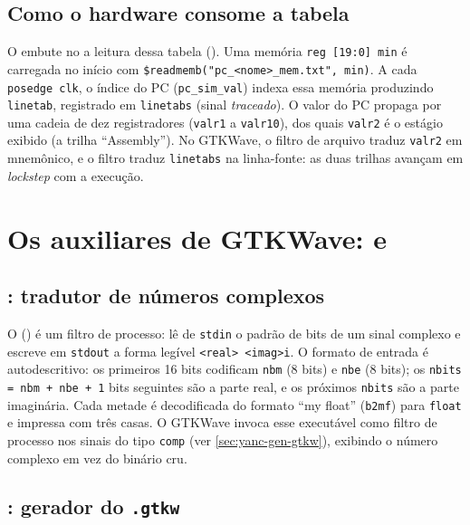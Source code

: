 \subsection{Como o hardware consome a tabela}
\label{sec:yanc-sidetable-hw}

O  embute no  a leitura dessa tabela
(). Uma memória \lstinline|reg [19:0] min| é carregada no início com
\lstinline|$readmemb("pc_<nome>_mem.txt", min)|. A cada \lstinline|posedge clk|,
o índice do PC (\lstinline|pc_sim_val|) indexa essa memória produzindo
\lstinline|linetab|, registrado em \lstinline|linetabs| (sinal \emph{traceado}). O
valor do PC propaga por uma cadeia de dez registradores (\lstinline|valr1| a
\lstinline|valr10|), dos quais \lstinline|valr2| é o estágio exibido (a trilha
\enquote{Assembly}). No GTKWave, o filtro de arquivo 
traduz \lstinline|valr2| em mnemônico, e o filtro  traduz
\lstinline|linetabs| na linha-fonte: as duas trilhas avançam em \emph{lockstep}
com a execução.

\section{Os auxiliares de GTKWave:  e }
\label{sec:yanc-gtkw}

\subsection{: tradutor de números complexos}
\label{sec:yanc-comp2gtkw}

O  () é um filtro de processo: lê de
\lstinline|stdin| o padrão de bits de um sinal complexo e escreve em
\lstinline|stdout| a forma legível \lstinline|<real> <imag>i|. O formato de
entrada é autodescritivo: os primeiros 16 bits codificam \lstinline|nbm| (8 bits)
e \lstinline|nbe| (8 bits); os \lstinline|nbits = nbm + nbe + 1| bits seguintes
são a parte real, e os próximos \lstinline|nbits| são a parte imaginária. Cada
metade é decodificada do formato \enquote{my float} (\lstinline|b2mf|) para
\lstinline|float| e impressa com três casas. O GTKWave invoca esse executável como
filtro de processo nos sinais do tipo \lstinline|comp| (ver
\autoref{sec:yanc-gen-gtkw}), exibindo o número complexo em vez do binário cru.

\subsection{: gerador do \texttt{.gtkw}}
\label{sec:yanc-gen-gtkw}

